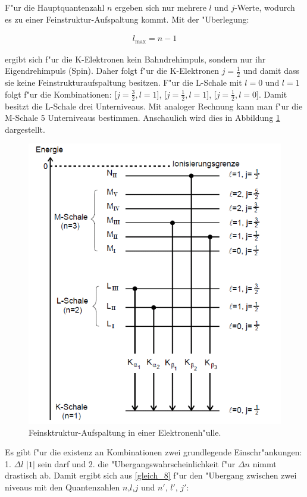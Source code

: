 		F"ur die Hauptquantenzahl $n$ ergeben sich nur mehrere $l$ und $j$-Werte, wodurch es zu einer Feinstruktur-Aufspaltung kommt.
		Mit der "Uberlegung:

		\begin{eqnarray*}
			l_\mathrm{max} = n - 1
		\end{eqnarray*}

		ergibt sich f"ur die K-Elektronen kein Bahndrehimpuls, sondern nur ihr Eigendrehimpuls (Spin). 
		Daher folgt f"ur die K-Elektronen $j = \frac{1}{2}$ und damit dass sie keine Fein\-struk\-tur\-auf\-spal\-tung besitzen.
		F"ur die L-Schale mit $l = 0$ und $l = 1$ folgt f"ur die Kombinationen: [$j = \frac{3}{2}, l = 1$], [$j = \frac{1}{2}, l = 1$], [$j = \frac{1}{2}, l = 0$].
		Damit besitzt die L-Schale drei Unterniveaus.
		Mit analoger Rechnung kann man f"ur die M-Schale 5 Unterniveaus bestimmen.
		Anschaulich wird dies in Abbildung \ref{roentgenfein} dargestellt.

		\begin{figure}[htbp]
			\centering
			\includegraphics[width = 12cm]{img/Roentgenuebergaengefein.png}
			\caption{Feinsktruktur-Aufspaltung in einer Elektronenh"ulle.}
			\label{roentgenfein}
		\end{figure}	

		Es gibt f"ur die existenz an Kombinationen zwei grundlegende Einschr"ankungen: 
		1. $\Delta l$ \le $|1|$ sein darf und 2. die "Ubergangswahrscheinlichkeit f"ur $\Delta n$  nimmt drastisch ab. 
		Damit ergibt sich aus \ref{gleich_8} f"ur den "Ubergang zwischen zwei niveaus mit den Quantenzahlen $n$,$l$,$j$ und $n'$, $l'$, $j'$:	

